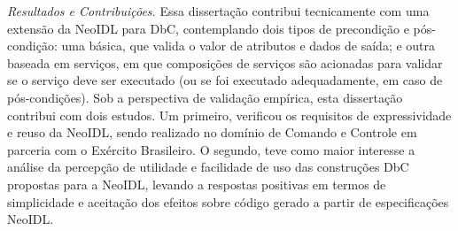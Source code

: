\emph{Resultados e Contribuições.}
Essa dissertação contribui tecnicamente com uma extensão da NeoIDL para DbC, contemplando
dois tipos de precondição e pós-condição: uma básica, que valida o valor de
atributos e dados de saída; e outra baseada em
serviços, em que composições de serviços são acionadas para validar se o serviço
deve ser executado (ou se foi executado adequadamente, em caso de pós-condições). %
Sob a perspectiva de validação empírica, esta dissertação contribui com dois estudos.
Um primeiro, verificou
os requisitos de expressividade e reuso da NeoIDL, sendo realizado no
domínio de Comando e Controle em parceria com o Exército Brasileiro. O segundo,
teve como maior interesse a análise da percepção de utilidade e facilidade de uso das construções DbC propostas para a NeoIDL,
levando a respostas positivas em termos de simplicidade e aceitação dos efeitos
sobre código gerado a partir de especificações NeoIDL.
%
%

  
\clearpage




